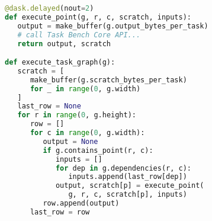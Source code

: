\begin{lstlisting}[language=Python,caption={Excerpt from Task Bench implementation in Dask.},label={lst:code-sample},style=codeblock,float]
@dask.delayed(nout=2)
def execute_point(g, r, c, scratch, inputs):
   output = make_buffer(g.output_bytes_per_task)
   # call Task Bench Core API...
   return output, scratch

def execute_task_graph(g):
   scratch = [
      make_buffer(g.scratch_bytes_per_task)
      for _ in range(0, g.width)
   ]
   last_row = None
   for r in range(0, g.height):
      row = []
      for c in range(0, g.width):
         output = None
         if g.contains_point(r, c):
            inputs = []
            for dep in g.dependencies(r, c):
               inputs.append(last_row[dep])
            output, scratch[p] = execute_point(
               g, r, c, scratch[p], inputs)
         row.append(output)
      last_row = row
\end{lstlisting}
